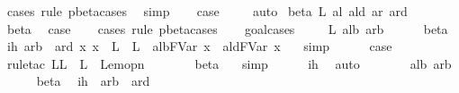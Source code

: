 \begin{isabellebody}
\ {\isacharparenleft}cases\ rule{\isacharcolon}\ pbeta{\isachardot}cases{\isacharparenright}\ \isamarkupfalse%
\ simp\isanewline
\ \ \isamarkupfalse%
\ {\isacharquery}case\ \isamarkupfalse%
\ {}\ \isamarkupfalse%
\ auto\isanewline
{}\isamarkupfalse%
\isanewline
{}\isamarkupfalse%
\ {\isacharparenleft}beta\ L\ al\ ald\ ar\ ard{\isacharparenright}\isanewline
\ \ \isamarkupfalse%
\ beta{\isacharparenleft}{}{\isacharparenright}\ \isamarkupfalse%
\ {\isacharquery}case\isanewline
\ \ \isamarkupfalse%
\ {\isacharparenleft}cases\ rule{\isacharcolon}\ pbeta{\isachardot}cases{\isacharparenright}\isanewline
\ \ \isamarkupfalse%
\ goal{\isacharunderscore}cases\isanewline
\ \ \isamarkupfalse%
\ {\isacharparenleft}{}\ L{\isacharprime}\ alb\ arb{\isacharparenright}\isanewline
\ \ \ \ \isamarkupfalse%
\ beta\ \isamarkupfalse%
\ ih{\isacharcolon}\ {\isachardoublequoteopen}arb\ {\isasymggreater}\ ard{\isachardoublequoteclose}\ {\isachardoublequoteopen}{\isasymAnd}x{\isachardot}\ x\ {\isasymnotin}\ L\ {\isasymunion}\ L{\isacharprime}\ {\isasymLongrightarrow}\ alb{\isacharcircum}FVar\ x\ {\isasymggreater}\ ald{\isacharcircum}FVar\ x{\isachardoublequoteclose}\ \ \isamarkupfalse%
\ simp{\isacharplus}\isanewline
\ \ \ \ \isamarkupfalse%
\ {\isacharquery}case\ \isamarkupfalse%
\ {}\ \isamarkupfalse%
\ {\isacharparenleft}rule{\isacharunderscore}tac\ L{\isacharequal}{\isachardoublequoteopen}L\ {\isasymunion}\ L{\isacharprime}{\isachardoublequoteclose}\ \ Lem{}{\isacharunderscore}{}{\isacharunderscore}{}opn{\isacharparenright}\isanewline
\ \ \ \ \isamarkupfalse%
\ \isamarkupfalse%
\ beta{\isacharparenleft}{}{\isacharparenright}\ {}{\isacharparenleft}{}{\isacharparenright}\ \isamarkupfalse%
\ simp\isanewline
\ \ \ \ \isamarkupfalse%
\ ih\ \isamarkupfalse%
\ auto\isanewline
\ \ \isamarkupfalse%
\isanewline
\ \ \isamarkupfalse%
\ {\isacharparenleft}{}\ alb\ arb{\isacharparenright}\isanewline
\ \ \ \ \isamarkupfalse%
\ beta\ \isamarkupfalse%
\ ih{\isacharcolon}\ \ {\isachardoublequoteopen}arb\ {\isasymggreater}\ ard{\isachardoublequoteclose}\ \isamarkupfalse%

\end{isabellebody}

